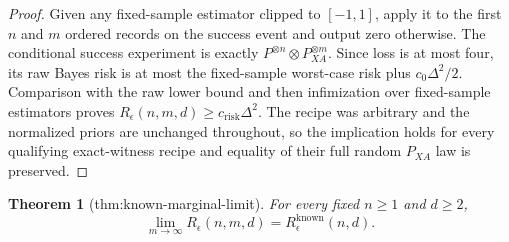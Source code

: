 \documentclass{article}
\newtheorem{theorem}{Theorem}
\begin{document}
\begin{proof}
Given any fixed-sample estimator clipped to \([-1,1]\), apply it to the first \(n\) and \(m\) ordered records on the success event and output zero otherwise.  The conditional success experiment is exactly \(P^{\otimes n}\otimes P_{XA}^{\otimes m}\).  Since loss is at most four, its raw Bayes risk is at most the fixed-sample worst-case risk plus \(c_0\Delta^2/2\).  Comparison with the raw lower bound and then infimization over fixed-sample estimators proves \(R_\epsilon(n,m,d)\ge c_{\mathrm{risk}}\Delta^2\).  The recipe was arbitrary and the normalized priors are unchanged throughout, so the implication holds for every qualifying exact-witness recipe and equality of their full random \(P_{XA}\) law is preserved.
\end{proof}

\begin{theorem}[thm:known-marginal-limit]\label{thm:known-marginal-limit}
For every fixed \(n\ge1\) and \(d\ge2\),
\[
 \lim_{m\to\infty}R_\epsilon(n,m,d)=R_\epsilon^{\mathrm{known}}(n,d).
\]
\end{theorem}
\end{document}
